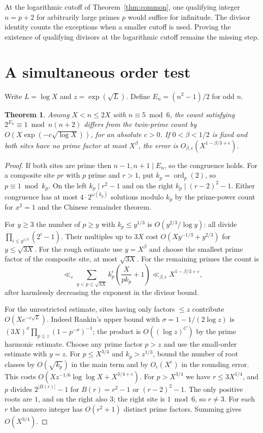 \documentclass[11pt]{article}
\newtheorem{theorem}{Theorem}[section]
\begin{document}
At the logarithmic cutoff of Theorem~\ref{thm:common}, one qualifying
integer \(n=p+2\) for arbitrarily large primes \(p\) would suffice
for infinitude. The divisor identity counts the exceptions when a
smaller cutoff is used. Proving the existence of qualifying divisors
at the logarithmic cutoff remains the missing step.


\setlength\emergencystretch{1.5em}
\section{A simultaneous order test}

Write \(L=\log X\) and \(z=\exp(\sqrt L)\). Define
\(E_n=(n^2-1)/2\) for odd \(n\).
\begin{theorem}\label{thm:simultaneous}
Among \(X<n\le2X\) with \(n\equiv5\bmod6\), the count satisfying
\(2^{E_n}\equiv1\bmod n(n+2)\) differs from the twin-prime count by
\(O(X\exp(-c\sqrt{\log X}))\), for an absolute \(c>0\).
If \(0<\beta<1/2\) is fixed and both sites have no prime factor
at most \(X^\beta\), the error is \(O_{\beta,\epsilon}(X^{1-\beta/3+\epsilon})\).
\end{theorem}
\begin{proof}
If both sites are prime then \(n-1,n+1\mid E_n\), so the congruence
holds. For a composite site \(pr\) with \(p\) prime and \(r>1\),
put \(k_p=\operatorname{ord}_p(2)\), so \(p\equiv1\bmod k_p\).
On the left \(k_p\mid r^2-1\) and on the right
\(k_p\mid(r-2)^2-1\). Either congruence has at most
\(4\cdot2^{\omega(k_p)}\) solutions modulo \(k_p\) by the
prime-power count for \(x^2=1\) and the Chinese remainder theorem.

For \(y\ge 3\) the number of \(p\ge y\) with \(k_p\le y^{1/3}\)
is \(O(y^{2/3}/\log y)\): all divide
\(\prod_{i\le y^{1/3}}(2^i-1)\). Their multiples up to \(3X\)
cost \(O(Xy^{-1/3}+y^{2/3})\) for \(y\le\sqrt{3X}\).
For the rough estimate use \(y=X^\beta\) and choose the smallest
prime factor of the composite site, at most \(\sqrt{3X}\).
For the remaining primes the count is
\[
 \ll_\epsilon\sum_{y<p\le\sqrt{3X}}k_p^\epsilon
               \left(\frac{X}{pk_p}+1\right)
 \ll_{\beta,\epsilon} X^{1-\beta/3+\epsilon},
\]
after harmlessly decreasing the exponent in the divisor bound.

For the unrestricted estimate, sites having only factors \(\le z\)
contribute \(O(Xe^{-c\sqrt L})\). Indeed Rankin's upper bound with
\(\sigma=1-1/(2\log z)\) is
\((3X)^\sigma\prod_{p\le z}(1-p^{-\sigma})^{-1}\); the product
is \(O((\log z)^C)\) by the prime harmonic estimate.
Choose any prime factor \(p>z\) and use the small-order estimate
with \(y=z\). For \(p\le X^{3/4}\) and \(k_p>z^{1/3}\), bound the
number of root classes by \(O(\sqrt{k_p})\) in the main term and by
\(O_\epsilon(X^\epsilon)\) in the rounding error. This costs
\(O(Xz^{-1/6}\log\log X+X^{3/4+\epsilon})\).
For \(p>X^{3/4}\) we have \(r\le3X^{1/4}\), and \(p\) divides
\(2^{|B(r)|}-1\) for \(B(r)=r^2-1\) or \((r-2)^2-1\).
The only positive roots are \(1\), and on the right also \(3\);
the right site is \(1\bmod6\), so \(r\ne3\). For each \(r\) the
nonzero integer has \(O(r^2+1)\) distinct prime factors. Summing
gives \(O(X^{3/4})\).
\end{proof}
\end{document}

